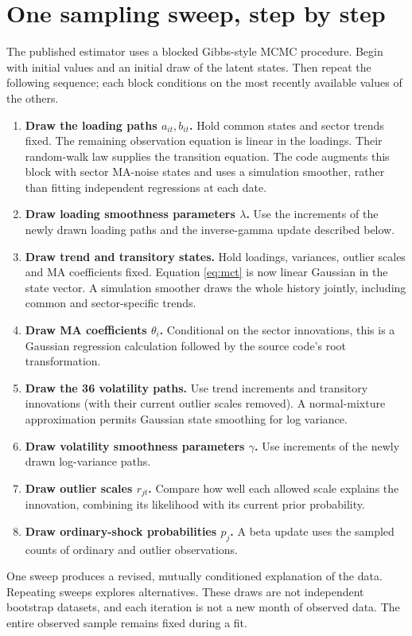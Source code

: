 \documentclass[11pt,a4paper]{article}
\begin{document}
\newpage
\section{One sampling sweep, step by step}
The published estimator uses a blocked Gibbs-style MCMC procedure. Begin with initial values and an initial draw of the latent states. Then repeat the following sequence; each block conditions on the most recently available values of the others.
\begin{enumerate}
\item \textbf{Draw the loading paths $a_{it},b_{it}$.} Hold common states and sector trends fixed. The remaining observation equation is linear in the loadings. Their random-walk law supplies the transition equation. The code augments this block with sector MA-noise states and uses a simulation smoother, rather than fitting independent regressions at each date.
\item \textbf{Draw loading smoothness parameters $\lambda$.} Use the increments of the newly drawn loading paths and the inverse-gamma update described below.
\item \textbf{Draw trend and transitory states.} Hold loadings, variances, outlier scales and MA coefficients fixed. Equation \eqref{eq:mct} is now linear Gaussian in the state vector. A simulation smoother draws the whole history jointly, including common and sector-specific trends.
\item \textbf{Draw MA coefficients $\theta_i$.} Conditional on the sector innovations, this is a Gaussian regression calculation followed by the source code's root transformation.
\item \textbf{Draw the 36 volatility paths.} Use trend increments and transitory innovations (with their current outlier scales removed). A normal-mixture approximation permits Gaussian state smoothing for log variance.
\item \textbf{Draw volatility smoothness parameters $\gamma$.} Use increments of the newly drawn log-variance paths.
\item \textbf{Draw outlier scales $r_{jt}$.} Compare how well each allowed scale explains the innovation, combining its likelihood with its current prior probability.
\item \textbf{Draw ordinary-shock probabilities $p_j$.} A beta update uses the sampled counts of ordinary and outlier observations.
\end{enumerate}
One sweep produces a revised, mutually conditioned explanation of the data. Repeating sweeps explores alternatives. These draws are not independent bootstrap datasets, and each iteration is not a new month of observed data. The entire observed sample remains fixed during a fit.
\end{document}

